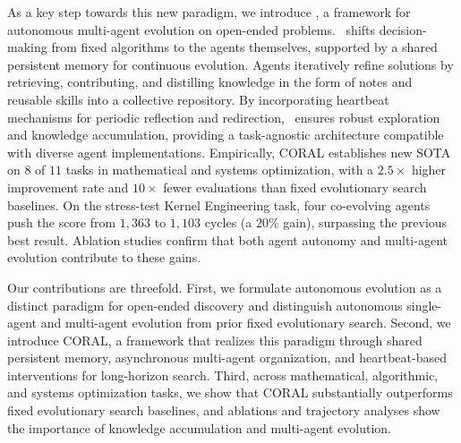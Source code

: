 As a key step towards this new paradigm, we introduce \method, a framework for autonomous multi-agent evolution on open-ended problems. \method\ shifts decision-making from fixed algorithms to the agents themselves, supported by a shared persistent memory for continuous evolution. Agents iteratively refine solutions by retrieving, contributing, and distilling knowledge in the form of notes and reusable skills into a collective repository. By incorporating heartbeat mechanisms for periodic reflection and redirection, \method\ ensures robust exploration and knowledge accumulation, providing a task-agnostic architecture compatible with diverse agent implementations.
Empirically, CORAL establishes new SOTA on $8$ of $11$ tasks in mathematical and systems optimization, with a $2.5\times$ higher improvement rate and $10\times$ fewer evaluations than fixed evolutionary search baselines. On the stress-test Kernel Engineering task, four co-evolving agents push the score from $1,363$ to $1,103$ cycles (a $20\%$ gain), surpassing the previous best result. Ablation studies confirm that both agent autonomy and multi-agent evolution contribute to these gains.

Our contributions are threefold. First, we formulate autonomous evolution as a distinct paradigm for open-ended discovery and distinguish autonomous single-agent and multi-agent evolution from prior fixed evolutionary search. Second, we introduce CORAL, a framework that realizes this paradigm through shared persistent memory, asynchronous multi-agent organization, and heartbeat-based interventions for long-horizon search. Third, across mathematical, algorithmic, and systems optimization tasks, we show that CORAL substantially outperforms fixed evolutionary search baselines, and ablations and trajectory analyses show the importance of knowledge accumulation and multi-agent evolution.




